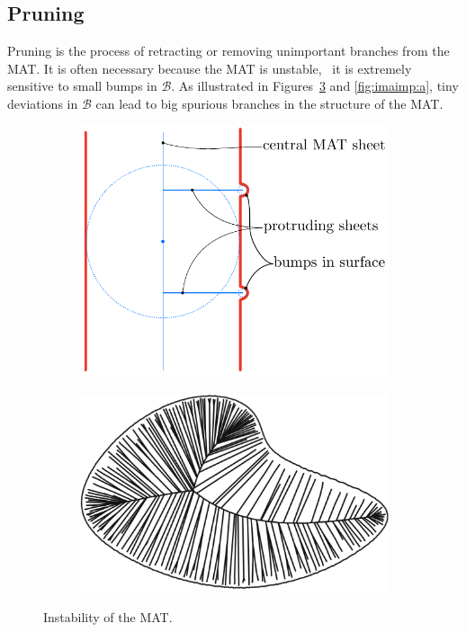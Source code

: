 \subsection{Pruning}
Pruning is the process of retracting or removing unimportant branches from the MAT.
It is often necessary because the MAT is unstable, \ie\ it is extremely sensitive to small bumps in $\mathcal{B}$.
As illustrated in Figures~\ref{fig:mat-instability} and \ref{fig:imaimp:a}, tiny deviations in $\mathcal{B}$ can lead to big spurious branches in the structure of the MAT.
\begin{figure}
	\centering
	\begin{subfigure}{0.425\linewidth}
		\centering
		\includegraphics[width=\textwidth]{figs/protrudingSheets.pdf}
		\label{fig:mat-bumps}
	\end{subfigure}
	\qquad
	\begin{subfigure}{0.50\linewidth}
		\centering
		\includegraphics[width=\textwidth]{figs/spurious_branches.png}
		\label{fig:sb_noise}
	\end{subfigure}
	\caption{Instability of the MAT.}
	\label{fig:mat-instability}
\end{figure}
